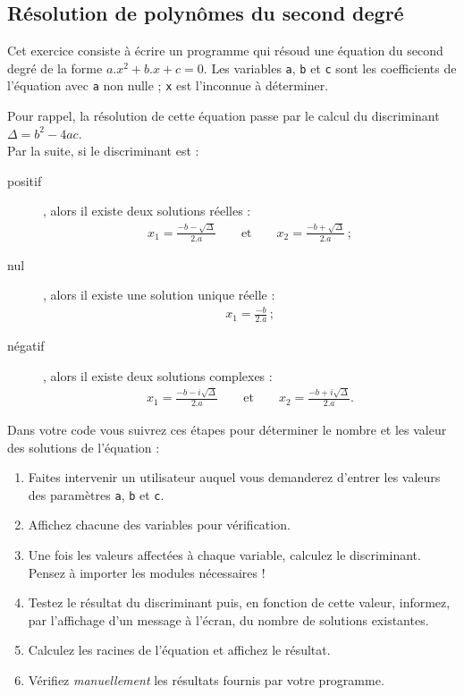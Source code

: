 

\subsection{Résolution de polynômes du second degré}

Cet exercice  consiste à écrire un programme qui résoud une  équation du second degré  de la
forme  $a.x^2+b.x+c =  0$.   Les variables  \texttt{a}, \texttt{b}  et
\texttt{c}  sont  les  coefficients   de  l'équation  avec  \texttt{a}
non nulle ; \texttt{x} est l'inconnue à déterminer.

Pour rappel,  la résolution de cette  équation passe par le  calcul du
discriminant $\Delta =  b^2-4ac$.\\ Par la suite, si  le 
discriminant est :

\begin{description}
\item[positif], alors il existe deux solutions réelles :
\begin{eqnarray*}
  x_1   =  \frac{-b-\sqrt{\Delta}}{2.a}   \qquad  \textrm{et}   \qquad
  x_2=\frac{-b+\sqrt{\Delta}}{2.a}\,;
\end{eqnarray*}
\item[nul], alors il existe une solution unique réelle :
\begin{eqnarray*}
  x_1 = \frac{-b}{2.a}\,;
\end{eqnarray*}
\item[négatif], alors il existe deux solutions complexes :
\begin{eqnarray*}
  x_1  =   \frac{-b-i\sqrt{\Delta}}{2.a}  \qquad   \textrm{et}  \qquad
  x_2=\frac{-b+i\sqrt{\Delta}}{2.a}.
\end{eqnarray*}
\end{description}


Dans votre code vous suivrez ces étapes pour déterminer le nombre et les valeur des solutions de l'équation :
\begin{enumerate}

\item Faites intervenir un utilisateur auquel vous demanderez d'entrer
  les valeurs des paramètres \texttt{a}, \texttt{b} et \texttt{c}.
\item Affichez chacune des variables pour vérification.
\item  Une fois  les  valeurs affectées à chaque variable, calculez  le
  discriminant.\\ Pensez à importer les modules nécessaires !
\item  Testez le  résultat du  discriminant  puis, en  fonction de  cette
  valeur, informez, par l'affichage d'un  message à l'écran, du nombre
  de solutions existantes.
\item Calculez  les racines de l'équation et affichez  le résultat.
\item Vérifiez \emph{manuellement} les résultats fournis par votre programme.

\end{enumerate}
